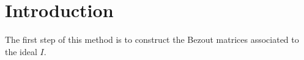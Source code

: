 \documentclass{standalone}
\begin{document}
\section{Introduction}
The first step of this method is to construct the Bezout matrices associated to the ideal $I$. 
\end{document}
